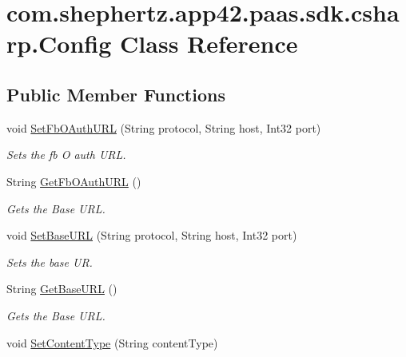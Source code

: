 \hypertarget{classcom_1_1shephertz_1_1app42_1_1paas_1_1sdk_1_1csharp_1_1_config}{\section{com.\+shephertz.\+app42.\+paas.\+sdk.\+csharp.\+Config Class Reference}
\label{classcom_1_1shephertz_1_1app42_1_1paas_1_1sdk_1_1csharp_1_1_config}
}
\subsection*{Public Member Functions}
\begin{DoxyCompactItemize}
\item 
void \hyperlink{classcom_1_1shephertz_1_1app42_1_1paas_1_1sdk_1_1csharp_1_1_config_ad4a500fd309818400d07081c97bf3a3b}{Set\+Fb\+O\+Auth\+U\+R\+L} (String protocol, String host, Int32 port)
\begin{DoxyCompactList}\small\item\em Sets the fb O auth U\+R\+L. \end{DoxyCompactList}\item 
String \hyperlink{classcom_1_1shephertz_1_1app42_1_1paas_1_1sdk_1_1csharp_1_1_config_a8ab21e2a56a804021121ec500549c4b6}{Get\+Fb\+O\+Auth\+U\+R\+L} ()
\begin{DoxyCompactList}\small\item\em Gets the Base U\+R\+L. \end{DoxyCompactList}\item 
void \hyperlink{classcom_1_1shephertz_1_1app42_1_1paas_1_1sdk_1_1csharp_1_1_config_a46f850e33a02ef0a45cd7b30bbdc19bf}{Set\+Base\+U\+R\+L} (String protocol, String host, Int32 port)
\begin{DoxyCompactList}\small\item\em Sets the base U\+R. \end{DoxyCompactList}\item 
String \hyperlink{classcom_1_1shephertz_1_1app42_1_1paas_1_1sdk_1_1csharp_1_1_config_a645921d5c3d7c81f01e703cba5d60aeb}{Get\+Base\+U\+R\+L} ()
\begin{DoxyCompactList}\small\item\em Gets the Base U\+R\+L. \end{DoxyCompactList}\item 
void \hyperlink{classcom_1_1shephertz_1_1app42_1_1paas_1_1sdk_1_1csharp_1_1_config_a60eaeefc20b048dad592a0b1540abce0}{Set\+Content\+Type} (String content\+Type)

\end{DoxyCompactItemize}
